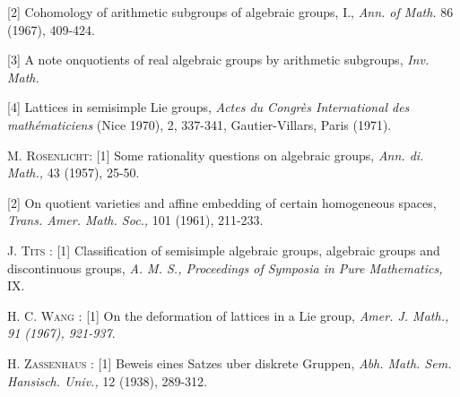 \begin{thebibliography}{99}
\bibitem{} [2] Cohomology of arithmetic subgroups of algebraic groups, I., \textit{Ann. of Math.} 86 (1967), 409-424.

\bibitem{} [3] A note on\pageoriginale quotients of real algebraic groups by arithmetic subgroups, \textit{Inv. Math.}

\bibitem{} [4] Lattices in semisimple Lie groups, \textit{Actes du Congr\`es International des math\'ematiciens} (Nice 1970), 2, 337-341, Gautier-Villars, Paris (1971).

\bibitem{} \textsc{M. Rosenlicht: } [1] Some rationality questions on algebraic groups, \textit{Ann. di. Math.,} 43 (1957),  25-50.

\bibitem{} [2] On quotient varieties and affine embedding of certain homogeneous spaces, \textit{Trans. Amer. Math. Soc.,} 101 (1961), 211-233.

\bibitem{} \textsc{J. Tits : } [1] Classification of semisimple algebraic groups, algebraic groups and discontinuous groups, \textit{A. M. S., Proceedings of Symposia in Pure Mathematics,} IX.

\bibitem{} \textsc{H. C. Wang :} [1] On the deformation of lattices in a Lie group, \textit{Amer. J. Math., 91 (1967), 921-937}.

\bibitem{} \textsc{H. Zassenhaus : } [1] Beweis eines Satzes uber diskrete Gruppen, \textit{Abh. Math. Sem. Hansisch. Univ.,} 12 (1938), 289-312.
\end{thebibliography}
